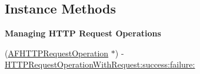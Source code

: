 \subsection*{Instance Methods}
\begin{Indent}{\bf Managing H\+T\+T\+P Request Operations}\par
{\em 

 

 }\begin{DoxyCompactItemize}
\item 
(\hyperlink{interface_a_f_h_t_t_p_request_operation}{A\+F\+H\+T\+T\+P\+Request\+Operation} $\ast$) -\/ \hyperlink{interface_a_f_h_t_t_p_request_operation_manager_a9189bf144d88d9a0baba0fda8f1494b8}{H\+T\+T\+P\+Request\+Operation\+With\+Request\+:success\+:failure\+:}
\end{DoxyCompactItemize}
\end{Indent}
